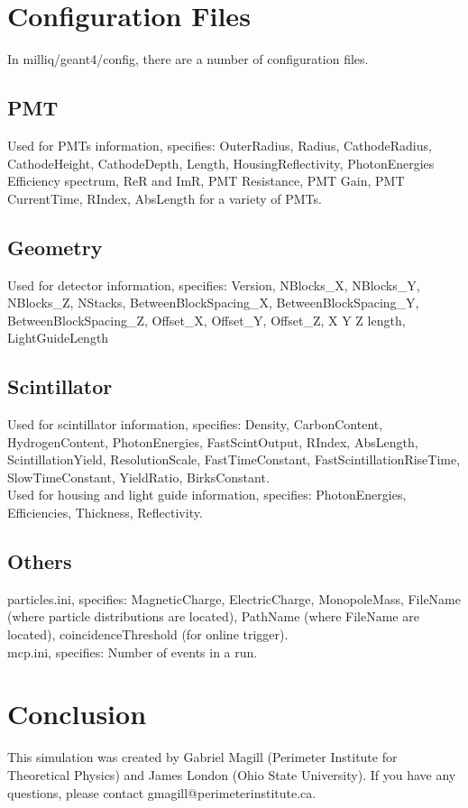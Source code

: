 \documentclass[prd,noshowpacs,nofootinbib,amsmath,amssymb,superscriptaddress]{revtex4}
\begin{document}
\section{Configuration Files}
In milliq/geant4/config, there are a number of configuration files.
\subsection{PMT}
Used for PMTs information, specifies: OuterRadius, Radius, CathodeRadius, CathodeHeight, CathodeDepth, Length, HousingReflectivity, PhotonEnergies Efficiency spectrum, ReR and ImR, PMT Resistance, PMT Gain, PMT CurrentTime, RIndex, AbsLength for a variety of PMTs.
\subsection{Geometry}
Used for detector information, specifies: Version, NBlocks\_X, NBlocks\_Y, NBlocks\_Z, NStacks, BetweenBlockSpacing\_X, BetweenBlockSpacing\_Y, BetweenBlockSpacing\_Z, Offset\_X, Offset\_Y, Offset\_Z, X Y Z length, LightGuideLength 
\subsection{Scintillator}
Used for scintillator information, specifies: Density, CarbonContent, HydrogenContent, PhotonEnergies, FastScintOutput, RIndex, AbsLength, ScintillationYield, ResolutionScale, FastTimeConstant, FastScintillationRiseTime, SlowTimeConstant, YieldRatio, BirksConstant.\\
Used for housing and light guide information, specifies: PhotonEnergies, Efficiencies, Thickness, Reflectivity.
\subsection{Others}
particles.ini, specifies: MagneticCharge, ElectricCharge, MonopoleMass, FileName (where particle distributions are located), PathName (where FileName are located), coincidenceThreshold (for online trigger).\\
mcp.ini, specifies: Number of events in a run.



\section{Conclusion}
This simulation was created by Gabriel Magill (Perimeter Institute for Theoretical Physics) and James London (Ohio State University). If you have any questions, please contact gmagill@perimeterinstitute.ca.
\end{document}
